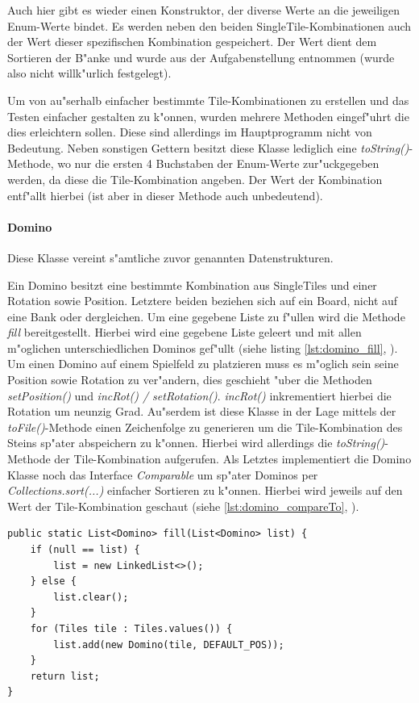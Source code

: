 Auch hier gibt es wieder einen Konstruktor, der diverse Werte an die jeweiligen Enum-Werte bindet. Es werden neben den beiden SingleTile-Kombinationen auch der Wert dieser spezifischen Kombination gespeichert. Der Wert dient dem Sortieren der B"anke und wurde aus der Aufgabenstellung entnommen (wurde also nicht willk"urlich festgelegt). 

Um von au"serhalb einfacher bestimmte Tile-Kombinationen zu erstellen und das Testen einfacher gestalten zu k"onnen, wurden mehrere Methoden eingef"uhrt die dies erleichtern sollen. Diese sind allerdings im Hauptprogramm nicht von Bedeutung. Neben sonstigen Gettern besitzt diese Klasse lediglich eine \emph{toString()}-Methode, wo nur die ersten 4 Buchstaben der Enum-Werte zur"uckgegeben werden, da diese die Tile-Kombination angeben. Der Wert der Kombination entf"allt hierbei (ist aber in dieser Methode auch unbedeutend).

\paragraph{Domino}
\label{par:domino}
Diese Klasse vereint s"amtliche zuvor genannten Datenstrukturen. 

Ein Domino besitzt eine bestimmte Kombination aus SingleTiles und einer Rotation sowie Position. Letztere beiden beziehen sich auf ein Board, nicht auf eine Bank oder dergleichen. Um eine gegebene Liste zu f"ullen wird die Methode \emph{fill} bereitgestellt. Hierbei wird eine gegebene Liste geleert und mit allen m"oglichen unterschiedlichen Dominos gef"ullt (siehe listing \ref{lst:domino_fill}, ). Um einen Domino auf einem Spielfeld zu platzieren muss es m"oglich sein seine Position sowie Rotation zu ver"andern, dies geschieht "uber die Methoden \emph{setPosition()} und \emph{incRot() / setRotation()}. \emph{incRot()} inkrementiert hierbei die Rotation um neunzig Grad. Au"serdem ist diese Klasse in der Lage mittels der \emph{toFile()}-Methode einen Zeichenfolge zu generieren um die Tile-Kombination des Steins sp"ater abspeichern zu k"onnen. Hierbei wird allerdings die \emph{toString()}-Methode der Tile-Kombination aufgerufen. Als Letztes implementiert die Domino Klasse noch das Interface \emph{Comparable} um sp"ater Dominos per \emph{Collections.sort(...)} einfacher Sortieren zu k"onnen. Hierbei wird jeweils auf den Wert der Tile-Kombination geschaut (siehe \ref{lst:domino_compareTo}, ). 

\begin{lstlisting}[float,style=CodeHighlighting,caption=Domino - fill,label=lst:domino_fill]
public static List<Domino> fill(List<Domino> list) {
    if (null == list) {
        list = new LinkedList<>();
    } else {
        list.clear();
    }
    for (Tiles tile : Tiles.values()) {
        list.add(new Domino(tile, DEFAULT_POS));
    }
    return list;
}
\end{lstlisting}

